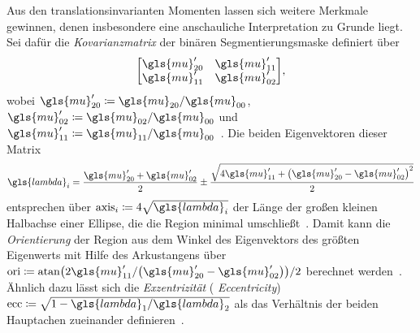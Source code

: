 Aus den translationsinvarianten Momenten lassen sich weitere Merkmale gewinnen, denen insbesondere eine anschauliche Interpretation zu Grunde liegt.
Sei dafür die \emph{Kovarianzmatrix} der binären Segmentierungsmaske definiert über
\begin{equation*}
  \begin{bmatrix}
    \gls{mu}^{\prime}_{20} & \gls{mu}^{\prime}_{11}\\
    \gls{mu}^{\prime}_{11} & \gls{mu}^{\prime}_{02}
  \end{bmatrix},
\end{equation*}
wobei $\gls{mu}^{\prime}_{20} \coloneqq \gls{mu}_{20}/\gls{mu}_{00}$, $\gls{mu}^{\prime}_{02} \coloneqq \gls{mu}_{02}/\gls{mu}_{00}$ und $\gls{mu}^{\prime}_{11} \coloneqq \gls{mu}_{11}/\gls{mu}_{00}$~\cite{momente}.
Die beiden Eigenvektoren dieser Matrix
\begin{equation*}
  \gls{lambda}_i = \frac{\gls{mu}^{\prime}_{20} + \gls{mu}^{\prime}_{02}}{2} \pm \frac{\sqrt{4\gls{mu}^{\prime}_{11} + {\left(\gls{mu}^{\prime}_{20} - \gls{mu}^{\prime}_{02}\right)}^2}}{2}
\end{equation*}
entsprechen über $\mathrm{axis}_i \coloneqq 4 \sqrt{\gls{lambda}_i}$ der Länge der großen \bzw{} kleinen Halbachse einer Ellipse, die die Region minimal umschließt~\cite{scikit, momente}.
Damit kann die \emph{Orientierung} der Region aus dem Winkel des Eigenvektors des größten Eigenwerts mit Hilfe des Ar\-kus\-tan\-gens über $\mathrm{ori} \coloneqq \mathrm{atan}\left(2\gls{mu}^{\prime}_{11}/\left(\gls{mu}^{\prime}_{20} - \gls{mu}^{\prime}_{02}\right)\right)/2$ berechnet werden~\cite{scikit}.
Ähnlich dazu lässt sich die \emph{Exzentrizität} (\engl{} \emph{Eccentricity}) $\mathrm{ecc} \coloneqq \sqrt{1 - \gls{lambda}_1/\gls{lambda}_2}$ als das Verhältnis der beiden Hauptachen zueinander definieren~\cite{scikit, Siedhoff}.

